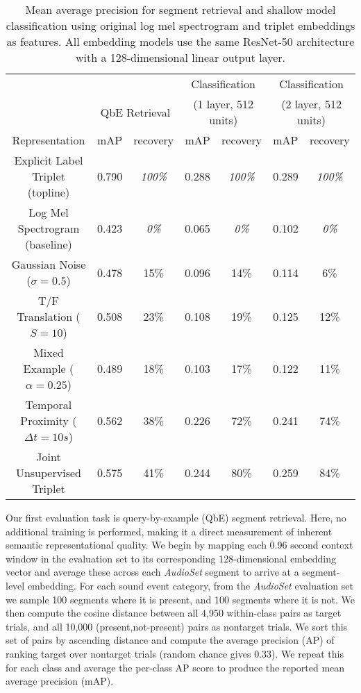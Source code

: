 \documentclass{article}
\begin{document}
\begin{table*}[t]
\vspace{-0.2cm}
  \centering
  \caption{Mean average precision for segment retrieval and shallow model
    classification using original log mel spectrogram and triplet embeddings as
    features. All embedding models use the same ResNet-50 architecture with a
    128-dimensional linear output layer.}
  \label{tab:results}
  \vspace{0.2cm}
  \begin{tabular}{c|c|c|c|c|c|c}
    \hline \hline
    & \multicolumn{2}{c|}{} & \multicolumn{2}{c|}{Classification} & \multicolumn{2}{c}{Classification}\\
    & \multicolumn{2}{c|}{QbE Retrieval} & \multicolumn{2}{c|}{(1 layer, 512 units)} &
    \multicolumn{2}{c}{(2 layer, 512 units)}\\
    \cline{2-7}
    Representation & mAP & recovery & mAP & recovery & mAP & recovery\\
    \hline \hline
    Explicit Label Triplet (topline)  & 0.790 & \emph{100\%} & 0.288 & \emph{100\%} & 0.289 & \emph{100\%} \\
    Log Mel Spectrogram (baseline) & 0.423 & \emph{0\%}   & 0.065 & \emph{0\%}   & 0.102 &   \emph{0\%}\\
    \hline 
    Gaussian Noise ($\sigma\!=\!0.5$)  & 0.478 & 15\%         & 0.096 & 14\%  & 0.114 &   6\%\\
    T/F Translation ($S\!=\!10$)       & 0.508 & 23\%         & 0.108 & 19\%  & 0.125 &  12\%\\
    Mixed Example ($\alpha\!=\!0.25$)  & 0.489 & 18\%         & 0.103 & 17\%  & 0.122 &  11\%\\
    Temporal Proximity ($\Delta t\!=\!10 s$) & 0.562 & 38\%  & 0.226 & 72\%  & 0.241 &  74\%\\
    \hline 
    Joint Unsupervised Triplet         & 0.575 & 41\%         & 0.244 & 80\%  & 0.259 &  84\%\\
    \hline  \hline
  \end{tabular}
\vspace{-0.2cm}
\end{table*}

Our first evaluation task is query-by-example (QbE) segment retrieval.  Here, no
additional training is performed, making it a direct measurement of inherent
semantic representational quality.  We begin by mapping each 0.96 second context
window in the evaluation set to its corresponding 128-dimensional embedding
vector and average these across each \emph{AudioSet} segment to arrive at a
segment-level embedding.  For each sound event category, from the
\emph{AudioSet} evaluation set we sample 100 segments where it is present, and
100 segments where it is not.  We then compute the cosine distance between all
4,950 within-class pairs as target trials, and all 10,000 (present,not-present)
pairs as nontarget trials.  We sort this set of pairs by ascending distance and
compute the average precision (AP) of ranking target over nontarget trials
(random chance gives 0.33).  We repeat this for each class and average the
per-class AP score to produce the reported mean average precision (mAP).
\end{document}
